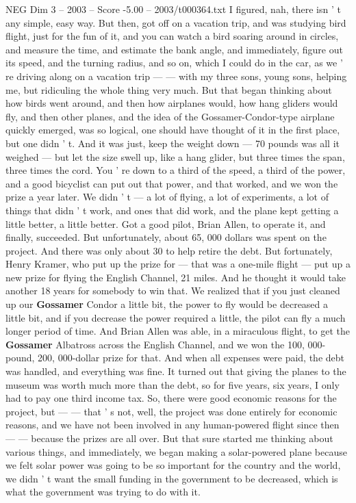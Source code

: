 \begin{textsample}{NEG Dim 3 – 2003 – Score -5.00 – 2003/t000364.txt}
I figured, nah, there isn ' t any simple, easy way.
But then, got off on a vacation trip, and was studying bird flight, just for the fun of it, and you can watch a bird soaring around in circles, and measure the time, and estimate the bank angle, and immediately, figure out its speed, and the turning radius, and so on, which I could do in the car, as we ' re driving along on a vacation trip — — with my three sons, young sons, helping me, but ridiculing the whole thing very much.
But that began thinking about how birds went around, and then how airplanes would, how hang gliders would fly, and then other planes, and the idea of the Gossamer-Condor-type airplane quickly emerged, was so logical, one should have thought of it in the first place, but one didn ' t.
And it was just, keep the weight down — 70 pounds was all it weighed — but let the size swell up, like a hang glider, but three times the span, three times the cord.
You ' re down to a third of the speed, a third of the power, and a good bicyclist can put out that power, and that worked, and we won the prize a year later.
We didn ' t — a lot of flying, a lot of experiments, a lot of things that didn ' t work, and ones that did work, and the plane kept getting a little better, a little better.
Got a good pilot, Brian Allen, to operate it, and finally, succeeded.
But unfortunately, about 65, 000 dollars was spent on the project.
And there was only about 30 to help retire the debt.
But fortunately, Henry Kramer, who put up the prize for — that was a one-mile flight — put up a new prize for flying the English Channel, 21 miles.
And he thought it would take another 18 years for somebody to win that.
We realized that if you just cleaned up our \textbf{Gossamer} Condor a little bit, the power to fly would be decreased a little bit, and if you decrease the power required a little, the pilot can fly a much longer period of time.
And Brian Allen was able, in a miraculous flight, to get the \textbf{Gossamer} Albatross across the English Channel, and we won the 100, 000-pound, 200, 000-dollar prize for that.
And when all expenses were paid, the debt was handled, and everything was fine.
It turned out that giving the planes to the museum was worth much more than the debt, so for five years, six years, I only had to pay one third income tax.
So, there were good economic reasons for the project, but — — that ' s not, well, the project was done entirely for economic reasons, and we have not been involved in any human-powered flight since then — — because the prizes are all over.
But that sure started me thinking about various things, and immediately, we began making a solar-powered plane because we felt solar power was going to be so important for the country and the world, we didn ' t want the small funding in the government to be decreased, which is what the government was trying to do with it.

\end{textsample}
